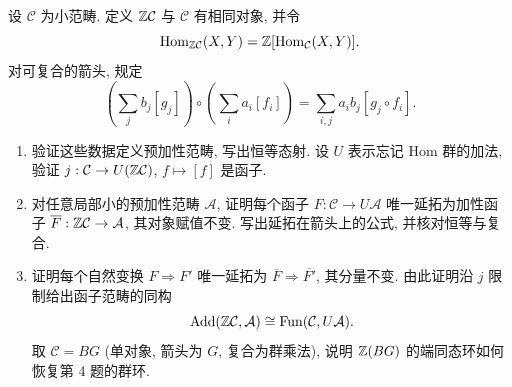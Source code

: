 \documentclass{article}
\begin{document}
\begin{problem}
设 $\mathcal C$ 为小范畴. 定义 $\mathbb{Z}\mathcal C$ 与 $\mathcal C$ 有相同对象, 并令
\[
  \operatorname{Hom}_{\mathbb{Z}\mathcal C}(X,Y)=\mathbb{Z}[\operatorname{Hom}_{\mathcal C}(X,Y)].
\]
对可复合的箭头, 规定
\[
  \left(\sum_j b_j[g_j]\right)\circ\left(\sum_i a_i[f_i]\right)
  =\sum_{i,j}a_i b_j[g_j\circ f_i].
\]
\begin{enumerate}
  \item[(a)] 验证这些数据定义预加性范畴, 写出恒等态射. 设 $U$ 表示忘记 Hom 群的加法, 验证 $j:\mathcal C\to U(\mathbb{Z}\mathcal C)$, $f\mapsto[f]$ 是函子.
  \item[(b)] 对任意局部小的预加性范畴 $\mathcal A$, 证明每个函子 $F:\mathcal C\to U\mathcal A$ 唯一延拓为加性函子 $\overline F:\mathbb{Z}\mathcal C\to\mathcal A$, 其对象赋值不变. 写出延拓在箭头上的公式, 并核对恒等与复合.
  \item[(c)] 证明每个自然变换 $F\Rightarrow F'$ 唯一延拓为 $\overline F\Rightarrow\overline{F'}$, 其分量不变. 由此证明沿 $j$ 限制给出函子范畴的同构
  \[
    \operatorname{Add}(\mathbb{Z}\mathcal C,\mathcal A)\cong\operatorname{Fun}(\mathcal C,U\mathcal A).
  \]
  取 $\mathcal C=BG$ (单对象, 箭头为 $G$, 复合为群乘法), 说明 $\mathbb{Z}(BG)$ 的端同态环如何恢复第 4 题的群环.
\end{enumerate}
\end{problem}
\end{document}
